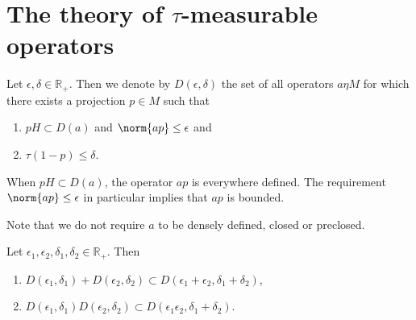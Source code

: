 \section{The theory of $\tau$-measurable operators}
\begin{definition}
   Let $\epsilon,\delta\in \mathbb{R}_+$. Then we denote by $D(\epsilon,\delta)$ the set of all operators $a\eta M$ for which there exists a projection $p\in M$ such that
   \begin{enumerate}
       \item $pH \subset D(a)$ and $\norm{ap}\leq \epsilon$ and
       \item $\tau(1-p)\leq \delta$.
   \end{enumerate}
\end{definition}
When $pH\subset D(a)$, the operator $ap$ is everywhere defined. The requirement $\norm{ap}\leq \epsilon$ in particular implies that $ap$ is bounded.\par
Note that we do not require $a$ to be densely defined, closed or preclosed.
\begin{proposition}\label{prop: 5}
    Let $\epsilon_1,\epsilon_2,\delta_1,\delta_2\in \mathbb{R}_+$. Then 
    \begin{enumerate}
        \item $D(\epsilon_1,\delta_1)+D(\epsilon_2,\delta_2)\subset D(\epsilon_1+\epsilon_2,\delta_1+\delta_2)$,
        \item $D(\epsilon_1,\delta_1)D(\epsilon_2,\delta_2)\subset D(\epsilon_1\epsilon_2,\delta_1+\delta_2)$.
    \end{enumerate}
\end{proposition}
